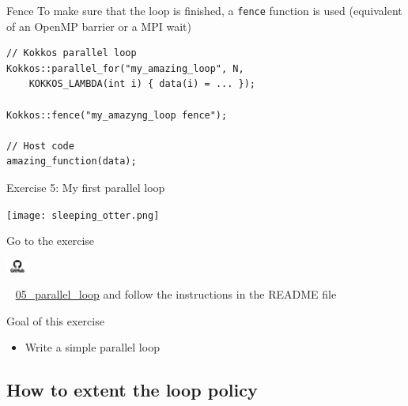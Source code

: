 \documentclass[aspectratio=169]{beamer}
\newcommand{\githublink}[2][2em]{%
    \hspace{-0.25em}%
    \parbox[c][#1][c]{#1}{%
        \includegraphics[width=#1]{GitHub-logo.png}%
    }%
    \hspace{-0.25em}%
    ~%
    #2%
}
\begin{document}

\begin{frame}[fragile]{Fence}
     To make sure that the loop is finished, a \texttt{fence} function is used (equivalent of an OpenMP barrier or a MPI wait)

    \begin{verbatim}
// Kokkos parallel loop
Kokkos::parallel_for("my_amazing_loop", N,
    KOKKOS_LAMBDA(int i) { data(i) = ... });

Kokkos::fence("my_amazyng_loop fence");

// Host code
amazing_function(data);
    \end{verbatim}
\end{frame}


\begin{frame}{Exercise 5: My first parallel loop}
    \begin{center}
        \texttt{[image: sleeping\_otter.png]}
    \end{center}

    Go to the exercise \githublink{\href{https://github.com/CExA-project/cexa-kokkos-tutorials/tree/main/exercises/05_parallel_loop}{05\_parallel\_loop}} and follow the instructions in the README file

    \begin{block}{Goal of this exercise}
        \begin{itemize}
            \item Write a simple parallel loop
        \end{itemize}
    \end{block}
\end{frame}


\subsection[Extended loop policy]{How to extent the loop policy}

\end{document}
